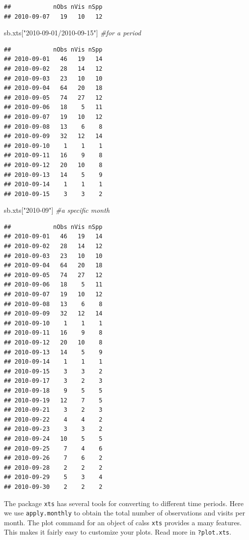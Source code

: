 \documentclass[
  10pt,
]{article}
\newenvironment{Shaded}{\begin{snugshade}}{\end{snugshade}}
\newcommand{\CommentTok}[1]{\textcolor[rgb]{0.56,0.35,0.01}{\textit{#1}}}
\newcommand{\NormalTok}[1]{#1}
\newcommand{\StringTok}[1]{\textcolor[rgb]{0.31,0.60,0.02}{#1}}
\begin{document}
\begin{verbatim}
##            nObs nVis nSpp
## 2010-09-07   19   10   12
\end{verbatim}

\begin{Shaded}
\begin{Highlighting}[]
\NormalTok{sb.xts[}\StringTok{"2010{-}09{-}01/2010{-}09{-}15"}\NormalTok{] }\CommentTok{\#for a period}
\end{Highlighting}
\end{Shaded}

\begin{verbatim}
##            nObs nVis nSpp
## 2010-09-01   46   19   14
## 2010-09-02   28   14   12
## 2010-09-03   23   10   10
## 2010-09-04   64   20   18
## 2010-09-05   74   27   12
## 2010-09-06   18    5   11
## 2010-09-07   19   10   12
## 2010-09-08   13    6    8
## 2010-09-09   32   12   14
## 2010-09-10    1    1    1
## 2010-09-11   16    9    8
## 2010-09-12   20   10    8
## 2010-09-13   14    5    9
## 2010-09-14    1    1    1
## 2010-09-15    3    3    2
\end{verbatim}

\begin{Shaded}
\begin{Highlighting}[]
\NormalTok{sb.xts[}\StringTok{"2010{-}09"}\NormalTok{] }\CommentTok{\#a specific month}
\end{Highlighting}
\end{Shaded}

\begin{verbatim}
##            nObs nVis nSpp
## 2010-09-01   46   19   14
## 2010-09-02   28   14   12
## 2010-09-03   23   10   10
## 2010-09-04   64   20   18
## 2010-09-05   74   27   12
## 2010-09-06   18    5   11
## 2010-09-07   19   10   12
## 2010-09-08   13    6    8
## 2010-09-09   32   12   14
## 2010-09-10    1    1    1
## 2010-09-11   16    9    8
## 2010-09-12   20   10    8
## 2010-09-13   14    5    9
## 2010-09-14    1    1    1
## 2010-09-15    3    3    2
## 2010-09-17    3    2    3
## 2010-09-18    9    5    5
## 2010-09-19   12    7    5
## 2010-09-21    3    2    3
## 2010-09-22    4    4    2
## 2010-09-23    3    3    2
## 2010-09-24   10    5    5
## 2010-09-25    7    4    6
## 2010-09-26    7    6    2
## 2010-09-28    2    2    2
## 2010-09-29    5    3    4
## 2010-09-30    2    2    2
\end{verbatim}

The package \texttt{xts} has several tools for converting to different time
periods. Here we use \texttt{apply.monthly} to obtain the total number of
observations and visits per month. The plot command for an object of
calss \texttt{xts} provides a many features. This makes it fairly easy to
customize your plots. Read more in \texttt{?plot.xts}.
\end{document}
